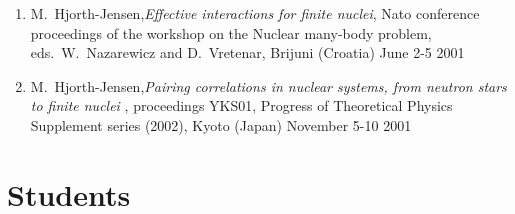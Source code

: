 \begin{enumerate}
\item M.~Hjorth-Jensen,{\em Effective interactions for finite nuclei},
     Nato conference proceedings of the workshop on the  Nuclear many-body problem, eds.~W.~Nazarewicz and D.~Vretenar,
     Brijuni (Croatia) June 2-5 2001 

\item M.~Hjorth-Jensen,{\em Pairing correlations in nuclear systems, from neutron stars to finite nuclei },
   proceedings YKS01, Progress of Theoretical Physics Supplement series
   (2002), 
     Kyoto (Japan) November 5-10 2001 

 
\end{enumerate}

\section*{Students}

